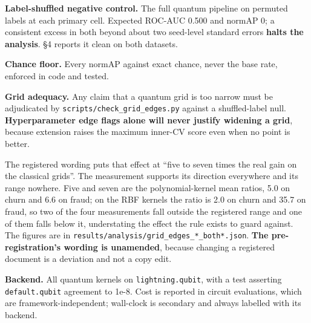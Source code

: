 \documentclass[
  10pt,
]{article}
\begin{document}
\textbf{Label-shuffled negative control.} The full quantum pipeline on
permuted labels at each primary cell. Expected ROC-AUC 0.500 and normAP
0; a consistent excess in both beyond about two seed-level standard
errors \textbf{halts the analysis}. \S{}4 reports it clean on both
datasets.

\textbf{Chance floor.} Every normAP against exact chance, never the base
rate, enforced in code and tested.

\textbf{Grid adequacy.} Any claim that a quantum grid is too narrow must
be adjudicated by \texttt{scripts/\allowbreak{}check\_\allowbreak{}grid\_\allowbreak{}edges.py} against a
shuffled-label null. \textbf{Hyperparameter edge flags alone will never
justify widening a grid}, because extension raises the maximum inner-CV
score even when no point is better.

The registered wording puts that effect at ``five to seven times the
real gain on the classical grids''. The measurement supports its
direction everywhere and its range nowhere. Five and seven are the
polynomial-kernel mean ratios, 5.0 on churn and 6.6 on fraud; on the RBF
kernels the ratio is 2.0 on churn and 35.7 on fraud, so two of the four
measurements fall outside the registered range and one of them falls
below it, understating the effect the rule exists to guard against. The
figures are in \texttt{results/\allowbreak{}analysis/\allowbreak{}grid\_\allowbreak{}edges\_\allowbreak{}*\_\allowbreak{}both*.json}.
\textbf{The pre-registration's wording is unamended}, because changing a
registered document is a deviation and not a copy edit.

\textbf{Backend.} All quantum kernels on \texttt{lightning.qubit}, with
a test asserting \texttt{default.qubit} agreement to 1e-8. Cost is
reported in circuit evaluations, which are framework-independent;
wall-clock is secondary and always labelled with its backend.
\end{document}
